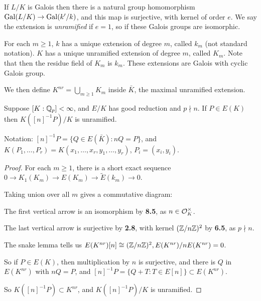 \documentclass[10pt,a4paper]{article}
\begin{document}
If $L/K$ is Galois then there is a natural group homomorphism $\operatorname{Gal}(L/K) \to \operatorname{Gal}(k'/k)$, and this map is surjective, with kernel of order $e$. We say the extension is \emph{unramified} if $e=1$, so if these Galois groups are isomorphic.

For each $m \geq 1$, $k$ has a unique extension of degree $m$, called $k_m$ (not standard notation). $K$ has a unique unramified extension of degree $m$, called $K_m$. Note that then the residue field of $K_m$ is $k_m$. These extensions are Galois with cyclic Galois group.

We then define $K^{nr} = \bigcup_{m\geq 1} K_m$ inside $\bar{K}$, the maximal unramified extension.

\begin{theorem}
  Suppose $[K:\mathbb{Q}_p] < \infty$, and $E/K$ has good reduction and $p\nmid n$. If $P \in E(K)$ then $K([n]^{-1}P)/K$ is unramified.
\end{theorem}
Notation: $[n]^{-1}P = \{Q \in E(\bar{K}) : nQ = P\}$, and $K(P_1, \ldots, P_r) = K(x_1, \ldots, x_r, y_1, \ldots, y_r)$, $P_i = (x_i, y_i)$.

\begin{proof}
  For each $m \geq 1$, there is a short exact sequence $0\to K_1(K_m) \to E(K_m) \to \tilde{E}(k_m) \to 0$.

  Taking union over all $m$ gives a commutative diagram:
  \begin{center}
  \end{center}
  The first vertical arrow is an isomorphism by \textbf{8.5}, as $n \in \mathcal{O}_K^\times$.

  The last vertical arrow is surjective by \textbf{2.8}, with kernel $(\mathbb{Z}/n\mathbb{Z})^2$ by \textbf{6.5}, as $p \nmid n$.

  The snake lemma tells us $E(K^{nr})[n]\cong (\mathbb{Z}/n\mathbb{Z})^2, E(K^{nr})/nE(K^{nr}) = 0$.

  So if $P \in E(K)$, then multiplication by $n$ is surjective, and there is $Q$ in $E(K^{nr})$ with $nQ = P$, and $[n]^{-1}P = \{Q+T:T\in E[n]\} \subset E(K^{nr})$.

  So $K([n]^{-1}P) \subset K^{nr}$, and $K([n]^{-1}P)/K$ is unramified.
\end{proof}
\end{document}
